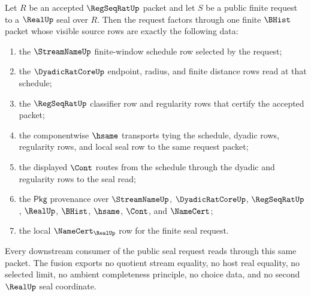 \begin{theorem}
\label{thm:real-regseqrat-finite-request-fusion}
Let $R$ be an accepted $\RegSeqRatUp$ packet and let $S$ be a public finite request to a $\RealUp$ seal over $R$. Then the request factors through one finite $\BHist$ packet whose visible source rows are exactly the following data:
\begin{enumerate}
\item the $\StreamNameUp$ finite-window schedule row selected by the request;
\item the $\DyadicRatCoreUp$ endpoint, radius, and finite distance rows read at that schedule;
\item the $\RegSeqRatUp$ classifier row and regularity rows that certify the accepted packet;
\item the componentwise $\hsame$ transports tying the schedule, dyadic rows, regularity rows, and local seal row to the same request packet;
\item the displayed $\Cont$ routes from the schedule through the dyadic and regularity rows to the seal read;
\item the $\mathsf{Pkg}$ provenance over $\StreamNameUp$, $\DyadicRatCoreUp$, $\RegSeqRatUp$, $\RealUp$, $\BHist$, $\hsame$, $\Cont$, and $\NameCert$;
\item the local $\NameCert_{\RealUp}$ row for the finite seal request.
\end{enumerate}
Every downstream consumer of the public seal request reads through this same packet. The fusion exports no quotient stream equality, no host real equality, no selected limit, no ambient completeness principle, no choice data, and no second $\RealUp$ seal coordinate.
\end{theorem}
